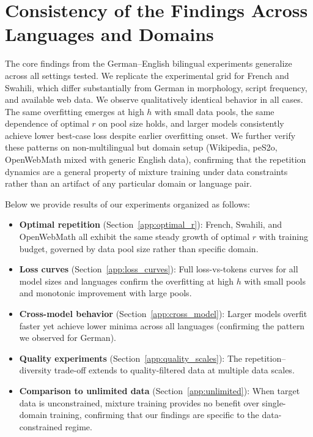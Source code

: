 





\newpage
\section{Consistency of the Findings Across Languages and Domains}
\label{app:consistency}
The core findings from the German--English bilingual experiments generalize across all settings tested.
We replicate the experimental grid for French and Swahili, which differ substantially from German in morphology, script frequency, and available web data.
We observe qualitatively identical behavior in all cases. 
The same overfitting emerges at high $h$ with small data pools, the same dependence of optimal $r$ on pool size holds, and larger models consistently achieve lower best-case loss despite earlier overfitting onset. We further verify these patterns on non-multilingual but domain setup (Wikipedia, peS2o, OpenWebMath mixed with generic English data), confirming that the repetition dynamics are a general property of mixture training under data constraints rather than an artifact of any particular domain or language pair.

Below we provide results of our experiments organized as follows:
\begin{itemize}
    \item \textbf{Optimal repetition} (Section~\ref{app:optimal_r}): French, Swahili, and OpenWebMath all exhibit the same steady growth of optimal $r$ with training budget, governed by data pool size rather than specific domain.
    \item \textbf{Loss curves} (Section~\ref{app:loss_curves}): Full loss-vs-tokens curves for all model sizes and languages confirm the overfitting at high $h$ with small pools and monotonic improvement with large pools.
    \item \textbf{Cross-model behavior} (Section~\ref{app:cross_model}): Larger models overfit faster yet achieve lower minima across all languages (confirming the pattern we observed for German).
    \item \textbf{Quality experiments} (Section~\ref{app:quality_scales}): The repetition--diversity trade-off extends to quality-filtered data at multiple data scales.
    \item \textbf{Comparison to unlimited data} (Section~\ref{app:unlimited}): When target data is unconstrained, mixture training provides no benefit over single-domain training, confirming that our findings are specific to the data-constrained regime.
\end{itemize}


